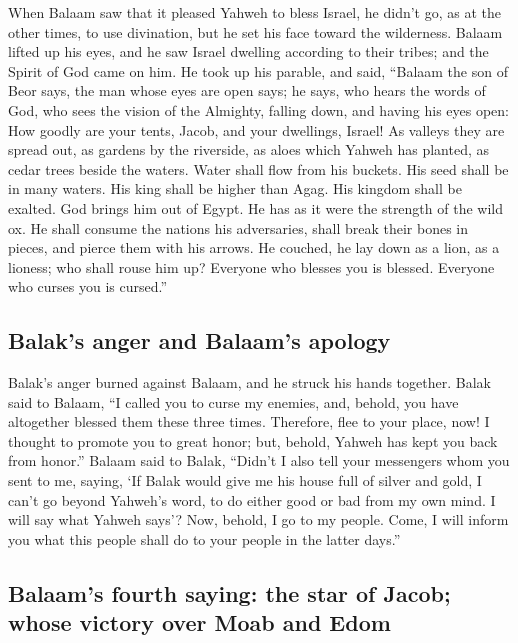  When Balaam saw that it pleased Yahweh to bless Israel,
he didn't go, as at the other times, to use divination, but he set his
face toward the wilderness.  Balaam lifted up his eyes,
and he saw Israel dwelling according to their tribes; and the Spirit of
God came on him.  He took up his parable, and said,
``Balaam the son of Beor says, the man whose eyes are open says;
 he says, who hears the words of God, who sees the vision
of the Almighty, falling down, and having his eyes open: 
How goodly are your tents, Jacob, and your dwellings, Israel!
 As valleys they are spread out, as gardens by the
riverside, as aloes which Yahweh has planted, as cedar trees beside the
waters.  Water shall flow from his buckets. His seed shall
be in many waters. His king shall be higher than Agag. His kingdom shall
be exalted.  God brings him out of Egypt. He has as it
were the strength of the wild ox. He shall consume the nations his
adversaries, shall break their bones in pieces, and pierce them with his
arrows.  He couched, he lay down as a lion, as a lioness;
who shall rouse him up? Everyone who blesses you is blessed. Everyone
who curses you is cursed.''

\hypertarget{balaks-anger-and-balaams-apology}{%
\subsection{Balak's anger and Balaam's
apology}\label{balaks-anger-and-balaams-apology}}

 Balak's anger burned against Balaam, and he struck his
hands together. Balak said to Balaam, ``I called you to curse my
enemies, and, behold, you have altogether blessed them these three
times.  Therefore, flee to your place, now! I thought to
promote you to great honor; but, behold, Yahweh has kept you back from
honor.''  Balaam said to Balak, ``Didn't I also tell your
messengers whom you sent to me, saying,  `If Balak would
give me his house full of silver and gold, I can't go beyond Yahweh's
word, to do either good or bad from my own mind. I will say what Yahweh
says'?  Now, behold, I go to my people. Come, I will
inform you what this people shall do to your people in the latter
days.''

\hypertarget{balaams-fourth-saying-the-star-of-jacob-whose-victory-over-moab-and-edom}{%
\subsection{Balaam's fourth saying: the star of Jacob; whose victory
over Moab and
Edom}\label{balaams-fourth-saying-the-star-of-jacob-whose-victory-over-moab-and-edom}}

